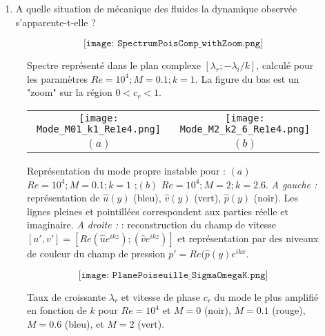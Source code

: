 \documentclass[a4paper,11pt]{article}
\begin{document}
\begin{enumerate}
\item A quelle situation de mécanique des fluides la dynamique observée s'apparente-t-elle ?






\end{enumerate}


\clearpage

\begin{figure}
$$\texttt{[image: SpectrumPoisComp\_withZoom.png]}
$$
\caption{Spectre représenté dans le plan complexe $[\lambda_r ; -\lambda_i/k]$, calculé pour les paramètres $Re = 10^4 ; M= 0.1 ; k=1$.
La figure du bas est un "zoom" sur la région $0<c_r<1$.}
\label{fig:Spectre}
\end{figure}


\begin{figure}
\begin{tabular}{cc}
\texttt{[image: Mode\_M01\_k1\_Re1e4.png]}
&
\texttt{[image: Mode\_M2\_k2\_6\_Re1e4.png]}
\\
$(a)$ & $(b)$
\end{tabular}
\caption{Représentation du mode propre instable pour : $(a)$ $Re = 10^4 ; M= 0.1 ; k=1$ ;$(b)$ $Re = 10^4 ; M= 2 ; k=2.6$. {\em A gauche :} représentation de $\hat{u}(y)$ (bleu), $\hat{v}(y)$ (vert),    $\hat{p}(y)$ (noir). Les lignes pleines et pointillées correspondent aux parties réelle et imaginaire. {\em A droite :} : reconstruction du champ de vitesse $[u',v'] = \left[ Re \left( \hat{u} e^{ikz} \right)  ;\left( \hat{v} e^{ikz} \right) \right]$ et représentation par des niveaux de couleur du champ de pression $p' = Re(\hat{p}(y) e^{i kx}$.    }
\label{fig:Mode1}
\end{figure}

\begin{figure}
$$
\texttt{[image: PlanePoiseuille\_SigmaOmegaK.png]}
$$
\caption{Taux de croissante $\lambda_r$ et vitesse de phase $c_r$ du mode le plus amplifié 
en fonction de $k$ pour $Re = 10^4$ et $M=0$ (noir), $M= 0.1$ (rouge), $M=0.6$ (bleu), et  $M=2$ (vert). }
\label{fig:branches}
\end{figure}
\end{document}
